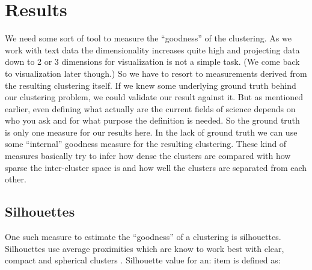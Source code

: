 \chapter{Results}
\label{chapter:results}

We need some sort of tool to measure the ``goodness'' of the 
clustering. As we work with text data the dimensionality increases 
quite high and projecting data down to 2 or 3 dimensions for 
visualization is not a simple task. (We come back to visualization 
later though.)
So we have to resort to measurements derived from the 
resulting clustering itself. If we knew some underlying ground 
truth behind our clustering problem, we could validate our result 
against it. But as mentioned earlier, even defining what actually 
are the current fields of science depends on who you ask and for 
what purpose the definition is needed. So the ground truth is only
one measure for our results here.
In the lack of ground truth we can use some ``internal'' goodness 
measure for the resulting clustering. These kind of measures 
basically try to infer how dense the clusters are compared with how 
sparse the inter-cluster space is and how well the clusters are 
separated from each other.


\section{Silhouettes}
One such measure to estimate the ``goodness'' of a clustering is 
silhouettes. Silhouettes use average proximities which are know 
to work best with clear, compact and spherical clusters 
\cite{rousseeuw_silhouettes:_1987}. Silhouette value for an: item 
is defined as:

